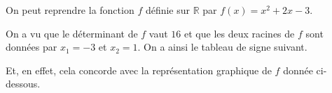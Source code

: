 \documentclass[11pt]{article}
\begin{document}
\begin{exemple}
  On peut reprendre la fonction $f$ définie sur $\mathbb{R}$ par
    $f(x) = x^2+2x-3$.\\
  \begin{minipage}[]{.65\textwidth}
  On a vu que le déterminant de $f$ vaut $16$ et que les deux racines de $f$
  sont données par $x_1=-3$ et $x_2=1$. On a ainsi le tableau de signe suivant.
  \begin{center}
  \end{center}
  Et, en effet, cela concorde avec la représentation graphique de $f$ donnée
  ci-dessous.
  \end{minipage}
  \begin{minipage}[]{.35\textwidth}
  \begin{center}
  \end{center}
  \end{minipage}
\end{exemple}
\end{document}
